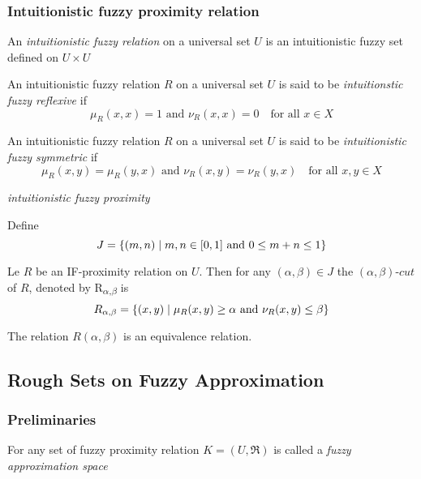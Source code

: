 \documentclass[11pt]{article}
\begin{document}
\subsubsection{Intuitionistic fuzzy proximity relation}
\label{sec:org5c1cdea}
\begin{definition}[]
An \emph{intuitionistic fuzzy relation} on a universal set \(U\) is an intuitionistic
fuzzy set defined on \(U\times U\)
\end{definition}
\begin{definition}[]
An intuitionistic fuzzy relation \(R\) on a universal set \(U\) is said to be 
\emph{intuitionstic fuzzy reflexive} if 
\begin{equation*}
\mu_R(x,x)=1\text{ and } \nu_R(x,x)=0\quad\text{for all } x\in X
\end{equation*}
\end{definition}
\begin{definition}[]
An intuitionistic fuzzy relation \(R\) on a universal set \(U\) is said to be 
\emph{intuitionistic fuzzy symmetric} if
\begin{equation*}
\mu_R(x,y)=\mu_R(y,x)\text{ and } \nu_R(x,y)=\nu_R(y,x)\quad\text{for all } x,y\in X
\end{equation*}
\end{definition}
\begin{definition}[]
\emph{intuitionistic fuzzy proximity}
\end{definition}
Define
\begin{equation*}
J=\left\{(m,n)\mid m,n\in[0,1] \text{ and } 0\le m+n\le 1\right\}
\end{equation*}
\begin{definition}[]
Le \(R\) be an IF-proximity relation on \(U\). Then for any \((\alpha,\beta)\in J\) the 
\((\alpha,\beta)\textit{-cut}\) of \(R\), denoted by R\textsubscript{\(\alpha\),\(\beta\)} is 
\begin{equation*}
R_{\alpha,\beta}=\left\{(x,y)\mid\mu_R(x,y)\ge\alpha\text{ and } \nu_R(x,y)\le\beta\right\}
\end{equation*}
\end{definition}
The relation \(R(\alpha,\beta)\) is an equivalence relation.
\subsection{Rough Sets on Fuzzy Approximation}
\label{sec:org5cdec4e}
\subsubsection{Preliminaries}
\label{sec:org17ac88f}
\begin{definition}[]
For any set of fuzzy proximity relation \(K=(U,\mathfrak{R})\) is called a
\emph{fuzzy approximation space}
\end{definition}
\end{document}
